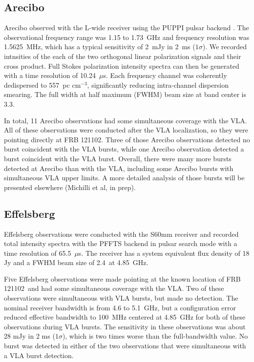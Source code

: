 \documentclass[twocolumn]{aastex61}
\newcommand{\frb}{FRB 121102}
\begin{document}
\subsection{Arecibo}

Arecibo observed with the L-wide receiver using the PUPPI pulsar backend \citep{2008SPIE.7019E..1DD,2010SPIE.7740E..0AF}. The observational frequency range was 1.15 to 1.73~GHz and frequency resolution was 1.5625~MHz, which has a typical sensitivity of 2~mJy in 2~ms ($1\sigma$). We recorded intnsities of the each of the two orthogonal linear polarization signals and their cross product. Full Stokes polarization intensity spectra can then be generated with a time resolution of 10.24~$\mu$s. Each frequency channel was coherently dedispersed to 557~pc cm$^{-3}$, significantly reducing intra-channel dispersion smearing. The full width at half maximum (FWHM) beam size at band center is 3.3\arcmin.

In total, 11 Arecibo observations had some simultaneous coverage with the VLA. All of these observations were conducted after the VLA localization, so they were pointing directly at \frb. Three of those Arecibo observations detected no burst coincident with the VLA bursts, while one Arecibo observation detected a burst coincident with the VLA burst. 
Overall, there were many more bursts detected at Arecibo than with the VLA, including some Arecibo bursts with simultaneous VLA upper limits. A more detailed analysis of those bursts will be presented elsewhere (Michilli et al, in prep).

\subsection{Effelsberg}

Effelsberg observations were conducted with the S60mm receiver and recorded total intensity spectra with the PFFTS backend in pulsar search mode with a time resolution of 65.5~$\mu$s. The receiver has a system equivalent flux density of 18 Jy and a FWHM beam size of 2.4\arcmin\ at 4.85~GHz. 

Five Effelsberg observations were made pointing at the known location of \frb\ and had some simultaneous coverage with the VLA. Two of these observations were simultaneous with VLA bursts, but made no detection. The nominal receiver bandwidth is from 4.6 to 5.1~GHz, but a configuration error reduced effective bandwidth to 100~MHz centered at 4.85~GHz for both of these observations during VLA bursts. The sensitivity in these observations was about 28 mJy in 2 ms ($1\sigma$), which is two times worse than the full-bandwidth value. No burst was detected in either of the two observations that were simultaneous with a VLA burst detection.
\end{document}
